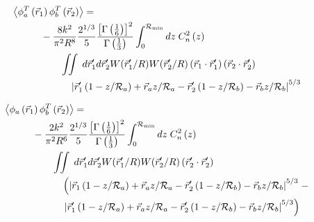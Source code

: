 \begin{equation}\label{tphase_n5}
\begin{aligned}
&\left\langle \phi^{T}_{a}\left(\vec{r}_{1}\right) \phi^{T}_{b}\left(\vec{r}_{2}\right)\right\rangle = \\
&\quad\quad\quad
-\frac{8k^{2}}{\pi^{2}R^{8}} 
\frac{2^{1/3}}{5}\frac{\left[\Gamma\left(\frac{1}{6}\right)\right]^{2}}{\Gamma\left(\frac{1}{3}\right)} 
\int_{0}^{\mathcal{R}_{\rm min}} dz\;C_{n}^{2}\left(z\right) \\
&\quad\quad\quad\quad\quad
\iint \; d\vec{r}^{\prime}_{1}d\vec{r}^{\prime}_{2} W(\vec{r}^{\prime}_{1}/R) W(\vec{r}^{\prime}_{2}/R)
\left(\vec{r}_{1} \cdot \vec{r}^{\prime}_{1}\right)
\left(\vec{r}_{2} \cdot \vec{r}^{\prime}_{2}\right)
\\
&\quad\quad\quad\quad\quad\quad
\left\vert \vec{r}^{\prime}_{1}\left(1-z/\mathcal{R}_{a}\right) + \vec{r}_{a} z/\mathcal{R}_{a} - 
 \vec{r}^{\prime}_{2}\left(1-z/\mathcal{R}_{b}\right) - \vec{r}_{b} z/\mathcal{R}_{b}\right\vert^{5/3}
\end{aligned}
\end{equation}

\begin{equation}\label{tprphase_n5}
\begin{aligned}
&\left\langle \phi_{a}\left(\vec{r}_{1}\right) \phi^{T}_{b}\left(\vec{r}_{2}\right)\right\rangle = \\
&\quad\quad\quad
-\frac{2k^{2}}{\pi^{2}R^{6}} 
\frac{2^{1/3}}{5}\frac{\left[\Gamma\left(\frac{1}{6}\right)\right]^{2}}{\Gamma\left(\frac{1}{3}\right)} 
\int_{0}^{\mathcal{R}_{\rm min}} dz\;C_{n}^{2}\left(z\right) \\
&\quad\quad\quad\quad\quad
\iint  \; d\vec{r}^{\prime}_{1}d\vec{r}^{\prime}_{2} W(\vec{r}^{\prime}_{1}/R) W(\vec{r}^{\prime}_{2}/R)
\left(\vec{r}^{\prime}_{2} \cdot \vec{r}^{\prime}_{2}\right)
\\
&\quad\quad\quad\quad\quad\quad
\left(
\left\vert \vec{r}_{1}\left(1-z/\mathcal{R}_{a}\right) + \vec{r}_{a} z/\mathcal{R}_{a} - \vec{r}^{\prime}_{2}\left(1-z/\mathcal{R}_{b}\right) - \vec{r}_{b} z/\mathcal{R}_{b}\right\vert^{5/3}
\right. -
\\
&\quad\quad\quad\quad\quad\quad
\left.
\left\vert \vec{r}^{\prime}_{1}\left(1-z/\mathcal{R}_{a}\right) + \vec{r}_{a} z/\mathcal{R}_{a} - 
 \vec{r}^{\prime}_{2}\left(1-z/\mathcal{R}_{b}\right) - \vec{r}_{b} z/\mathcal{R}_{b}\right\vert^{5/3}
\right)
\end{aligned}
\end{equation}


